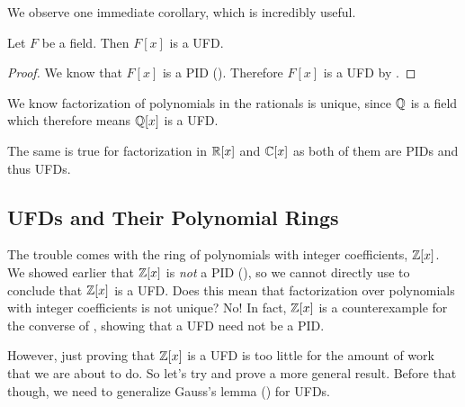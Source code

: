 We observe one immediate corollary, which is incredibly useful.

\begin{corollary}\label{corollary-polynomial-ring-over-field-is-UFD}
    Let $F$ be a field. Then $F[x]$ is a UFD.
\end{corollary}
\begin{proof}
    We know that $F[x]$ is a PID (). Therefore $F[x]$ is a UFD by .
\end{proof}

\begin{example}
    We know factorization of polynomials in the rationals is unique, since $\mathbb{Q}$ is a field which therefore means $\mathbb{Q}[x]$ is a UFD.
\end{example}
\begin{example}
    The same is true for factorization in $\mathbb{R}[x]$ and $\mathbb{C}[x]$ as both of them are PIDs and thus UFDs.
\end{example}

\subsection{UFDs and Their Polynomial Rings}
The trouble comes with the ring of polynomials with integer coefficients, $\mathbb{Z}[x]$. We showed earlier that $\mathbb{Z}[x]$ is \textit{not} a PID (), so we cannot directly use  to conclude that $\mathbb{Z}[x]$ is a UFD. Does this mean that factorization over polynomials with integer coefficients is not unique? No! In fact, $\mathbb{Z}[x]$ is a counterexample for the converse of , showing that a UFD need not be a PID.

However, just proving that $\mathbb{Z}[x]$ is a UFD is too little for the amount of work that we are about to do. So let's try and prove a more general result. Before that though, we need to generalize Gauss's lemma () for UFDs.

